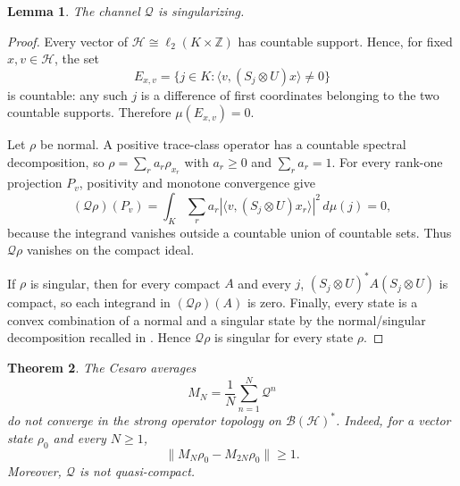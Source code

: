 \documentclass[11pt]{article}
\newtheorem{theorem}{Theorem}
\newtheorem{lemma}[theorem]{Lemma}
\newcommand{\B}{\mathcal B}
\newcommand{\Q}{\mathcal Q}
\begin{document}
\begin{lemma}\label{lem:singular}
The channel $\Q$ is singularizing.
\end{lemma}

\begin{proof}
Every vector of $\mathcal H\cong\ell_2(K\times\mathbb Z)$ has countable
support. Hence, for fixed $x,v\in\mathcal H$, the set
\[
 E_{x,v}=\{j\in K:\langle v,(S_j\otimes U)x\rangle\neq0\}
\]
is countable: any such $j$ is a difference of first coordinates belonging to
the two countable supports. Therefore $\mu(E_{x,v})=0$.

Let $\rho$ be normal. A positive trace-class operator has a countable spectral
decomposition, so $\rho=\sum_r a_r\rho_{x_r}$ with $a_r\geq0$ and
$\sum_r a_r=1$. For every rank-one projection $P_v$, positivity and monotone
convergence give
\[
 (\Q\rho)(P_v)
 =\int_K\sum_r a_r|\langle v,(S_j\otimes U)x_r\rangle|^2\,d\mu(j)=0,
\]
because the integrand vanishes outside a countable union of countable sets.
Thus $\Q\rho$ vanishes on the compact ideal.

If $\rho$ is singular, then for every compact $A$ and every $j$,
$(S_j\otimes U)^*A(S_j\otimes U)$ is compact, so each integrand in
$(\Q\rho)(A)$ is zero. Finally, every state is a convex combination of a
normal and a singular state by the normal/singular decomposition recalled in
\cite{Dzhenzher}. Hence $\Q\rho$ is singular for every state $\rho$.
\end{proof}

\begin{theorem}\label{thm:main}
The Cesaro averages
\[
 M_N=\frac1N\sum_{n=1}^N\Q^n
\]
do not converge in the strong operator topology on $\B(\mathcal H)^*$.
Indeed, for a vector state $\rho_0$ and every $N\geq1$,
\[
 \|M_N\rho_0-M_{2N}\rho_0\|\geq1.
\]
Moreover, $\Q$ is not quasi-compact.
\end{theorem}
\end{document}
